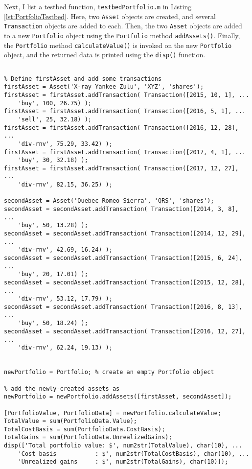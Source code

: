 Next, I list a testbed function, \texttt{testbedPortfolio.m} in Listing \ref{lst:PortfolioTestbed}. Here, two \texttt{Asset} objects are created, and several \texttt{Transaction} objects are added to each. Then, the two \texttt{Asset} objects are added to a new \texttt{Portfolio} object using the \texttt{Portfolio} method \texttt{addAssets()}. Finally, the \texttt{Portfolio} method \texttt{calculateValue()} is invoked on the new \texttt{Portfolio} object, and the returned data is printed using the \texttt{disp()} function.
\begin{lstlisting}[style=Matlab-editor, caption={The class definition for \texttt{Portfolio}, a container class for objects of class \texttt{Asset}.}, label={lst:PortfolioTestbed}]
% testbedPortfolio.m

% Define firstAsset and add some transactions
firstAsset = Asset('X-ray Yankee Zulu', 'XYZ', 'shares');
firstAsset = firstAsset.addTransaction( Transaction([2015, 10, 1], ...
    'buy', 100, 26.75) );
firstAsset = firstAsset.addTransaction( Transaction([2016, 5, 1], ...
    'sell', 25, 32.18) );
firstAsset = firstAsset.addTransaction( Transaction([2016, 12, 28], ...
    'div-rnv', 75.29, 33.42) );
firstAsset = firstAsset.addTransaction( Transaction([2017, 4, 1], ...
    'buy', 30, 32.18) );
firstAsset = firstAsset.addTransaction( Transaction([2017, 12, 27], ...
    'div-rnv', 82.15, 36.25) );

secondAsset = Asset('Quebec Romeo Sierra', 'QRS', 'shares');
secondAsset = secondAsset.addTransaction( Transaction([2014, 3, 8], ...
    'buy', 50, 13.28) );
secondAsset = secondAsset.addTransaction( Transaction([2014, 12, 29], ...
    'div-rnv', 42.69, 16.24) );
secondAsset = secondAsset.addTransaction( Transaction([2015, 6, 24], ...
    'buy', 20, 17.01) );
secondAsset = secondAsset.addTransaction( Transaction([2015, 12, 28], ...
    'div-rnv', 53.12, 17.79) );
secondAsset = secondAsset.addTransaction( Transaction([2016, 8, 13], ...
    'buy', 50, 18.24) );
secondAsset = secondAsset.addTransaction( Transaction([2016, 12, 27], ...
    'div-rnv', 62.24, 19.13) );


newPortfolio = Portfolio; % create an empty Portfolio object

% add the newly-created assets as 
newPortfolio = newPortfolio.addAssets([firstAsset, secondAsset]);

[PortfolioValue, PortfolioData] = newPortfolio.calculateValue;
TotalValue = sum(PortfolioData.Value);
TotalCostBasis = sum(PortfolioData.CostBasis);
TotalGains = sum(PortfolioData.UnrealizedGains);
disp(['Total portfolio value: $', num2str(TotalValue), char(10), ...
    'Cost basis           : $', num2str(TotalCostBasis), char(10), ...
    'Unrealized gains     : $', num2str(TotalGains), char(10)]);
\end{lstlisting}
